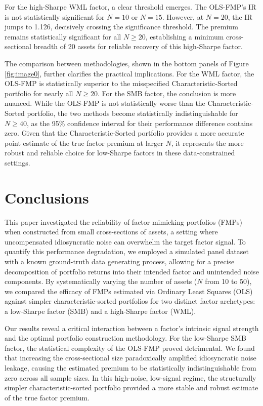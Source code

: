 \documentclass[]{article}
\begin{document}
For the high-Sharpe WML factor, a clear threshold emerges. The OLS-FMP's IR is not statistically significant for $N=10$ or $N=15$. However, at $N=20$, the IR jumps to 1.126, decisively crossing the significance threshold. The premium remains statistically significant for all $N \ge 20$, establishing a minimum cross-sectional breadth of 20 assets for reliable recovery of this high-Sharpe factor.

The comparison between methodologies, shown in the bottom panels of Figure \ref{fig:image0}, further clarifies the practical implications. For the WML factor, the OLS-FMP is statistically superior to the misspecified Characteristic-Sorted portfolio for nearly all $N \ge 20$. For the SMB factor, the conclusion is more nuanced. While the OLS-FMP is not statistically worse than the Characteristic-Sorted portfolio, the two methods become statistically indistinguishable for $N \ge 40$, as the 95\% confidence interval for their performance difference contains zero. Given that the Characteristic-Sorted portfolio provides a more accurate point estimate of the true factor premium at larger $N$, it represents the more robust and reliable choice for low-Sharpe factors in these data-constrained settings.

\section{Conclusions}
\label{sec:conclusions}
This paper investigated the reliability of factor mimicking portfolios (FMPs) when constructed from small cross-sections of assets, a setting where uncompensated idiosyncratic noise can overwhelm the target factor signal. To quantify this performance degradation, we employed a simulated panel dataset with a known ground-truth data generating process, allowing for a precise decomposition of portfolio returns into their intended factor and unintended noise components. By systematically varying the number of assets ($N$ from 10 to 50), we compared the efficacy of FMPs estimated via Ordinary Least Squares (OLS) against simpler characteristic-sorted portfolios for two distinct factor archetypes: a low-Sharpe factor (SMB) and a high-Sharpe factor (WML).

Our results reveal a critical interaction between a factor's intrinsic signal strength and the optimal portfolio construction methodology. For the low-Sharpe SMB factor, the statistical complexity of the OLS-FMP proved detrimental. We found that increasing the cross-sectional size paradoxically amplified idiosyncratic noise leakage, causing the estimated premium to be statistically indistinguishable from zero across all sample sizes. In this high-noise, low-signal regime, the structurally simpler characteristic-sorted portfolio provided a more stable and robust estimate of the true factor premium.
\end{document}
